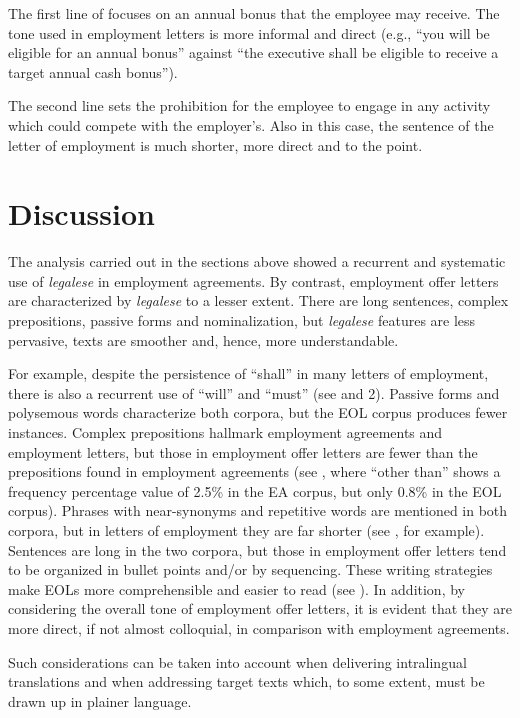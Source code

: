 \documentclass[output=paper]{langscibook}
\begin{document}
The first line of  focuses on an annual bonus that the employee may receive. The tone used in employment letters is more informal and direct (e.g., “you will be eligible for an annual bonus” against “the executive shall be eligible to receive a target annual cash bonus”).

The second line sets the prohibition for the employee to engage in any activity which could compete with the employer’s. Also in this case, the sentence of the letter of employment is much shorter, more direct and to the point.

\section{Discussion}\label{sec:giampieri:5}

The analysis carried out in the sections above showed a recurrent and systematic use of \textit{legalese} in employment agreements. By contrast, employment offer letters are characterized by \textit{legalese} to a lesser extent. There are long sentences, complex prepositions, passive forms and nominalization, but \textit{legalese} features are less pervasive, texts are smoother and, hence, more understandable.

For example, despite the persistence of “shall” in many letters of employment, there is also a recurrent use of “will” and “must” (see  and 2). Passive forms and polysemous words characterize both corpora, but the EOL corpus produces fewer instances. Complex prepositions hallmark employment agreements and employment letters, but those in employment offer letters are fewer than the prepositions found in employment agreements (see , where “other than” shows a frequency percentage value of 2.5\% in the EA corpus, but only 0.8\% in the EOL corpus). Phrases with near-synonyms and repetitive words are mentioned in both corpora, but in letters of employment they are far shorter (see , for example). Sentences are long in the two corpora, but those in employment offer letters tend to be organized in bullet points and/or by sequencing. These writing strategies make EOLs more comprehensible and easier to read (see ). In addition, by considering the overall tone of employment offer letters, it is evident that they are more direct, if not almost colloquial, in comparison with employment agreements.

Such considerations can be taken into account when delivering intralingual translations and when addressing target texts which, to some extent, must be drawn up in plainer language.
\end{document}
